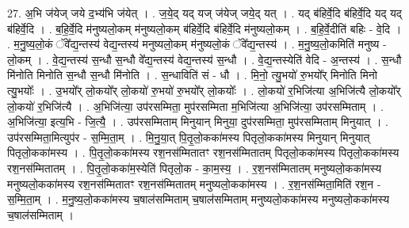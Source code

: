 \documentclass[17pt]{extarticle}
\begin{document}
27. अ॒भि ज॑येज् जये द॒भ्य॑भि ज॑येत् । . ज॒ये॒द् यद् यज् ज॑येज् जये॒द् यत् । . यद् ब॑हिर्वे॒दि ब॑हिर्वे॒दि यद् यद् ब॑हिर्वे॒दि । . ब॒हि॒र्वे॒दि म॑नुष्यलो॒कम् म॑नुष्यलो॒कम् ब॑हिर्वे॒दि ब॑हिर्वे॒दि म॑नुष्यलो॒कम् । . ब॒हि॒र्वे॒दीति॑ बहिः - वे॒दि । . म॒नु॒ष्य॒लो॒कं ॅवे᳚द्य॒न्तस्य॑ वेद्य॒न्तस्य॑ मनुष्यलो॒कम् म॑नुष्यलो॒कं ॅवे᳚द्य॒न्तस्य॑ । . म॒नु॒ष्य॒लो॒कमिति॑ मनुष्य - लो॒कम् । . वे॒द्य॒न्तस्य॑ स॒न्धौ स॒न्धौ वे᳚द्य॒न्तस्य॑ वेद्य॒न्तस्य॑ स॒न्धौ । . वे॒द्य॒न्तस्येति॑ वेदि - अ॒न्तस्य॑ । . स॒न्धौ मि॑नोति मिनोति स॒न्धौ स॒न्धौ मि॑नोति । . स॒न्धाविति॑ सं - धौ । . मि॒नो॒ त्यु॒भयो॑ रु॒भयो᳚र् मिनोति मिनो त्यु॒भयोः᳚ । . उ॒भयो᳚र् लो॒कयो᳚र् लो॒कयो॑ रु॒भयो॑ रु॒भयो᳚र् लो॒कयोः᳚ । . लो॒कयो॑ र॒भिजि॑त्या अ॒भिजि॑त्यै लो॒कयो᳚र् लो॒कयो॑ र॒भिजि॑त्यै । . अ॒भिजि॑त्या॒ उप॑रसम्मिता॒ मुप॑रसम्मिता म॒भिजि॑त्या अ॒भिजि॑त्या॒ उप॑रसम्मिताम् । . अ॒भिजि॑त्या॒ इत्य॒भि - जि॒त्यै॒ । . उप॑रसम्मिताम् मिनुयान् मिनुया॒ दुप॑रसम्मिता॒ मुप॑रसम्मिताम् मिनुयात् । . उप॑रसम्मिता॒मित्युप॑र - स॒म्मि॒ता॒म् । . मि॒नु॒या॒त् पि॒तृ॒लो॒कका॑मस्य पितृलो॒कका॑मस्य मिनुयान् मिनुयात् पितृलो॒कका॑मस्य । . पि॒तृ॒लो॒कका॑मस्य रश॒नस॑म्मितातꣳ रश॒नस॑म्मितातम् पितृलो॒कका॑मस्य पितृलो॒कका॑मस्य रश॒नस॑म्मितातम् । . पि॒तृ॒लो॒कका॑म॒स्येति॑ पितृलो॒क - का॒म॒स्य॒ । . र॒श॒नस॑म्मितातम् मनुष्यलो॒कका॑मस्य मनुष्यलो॒कका॑मस्य रश॒नस॑म्मितातꣳ रश॒नस॑म्मितातम् मनुष्यलो॒कका॑मस्य । . र॒श॒नस॑म्मिता॒मिति॑ रश॒न - स॒म्मि॒ता॒म् । . म॒नु॒ष्य॒लो॒कका॑मस्य च॒षाल॑सम्मिताम् च॒षाल॑सम्मिताम् मनुष्यलो॒कका॑मस्य मनुष्यलो॒कका॑मस्य च॒षाल॑सम्मिताम् । \newline
\end{document}
